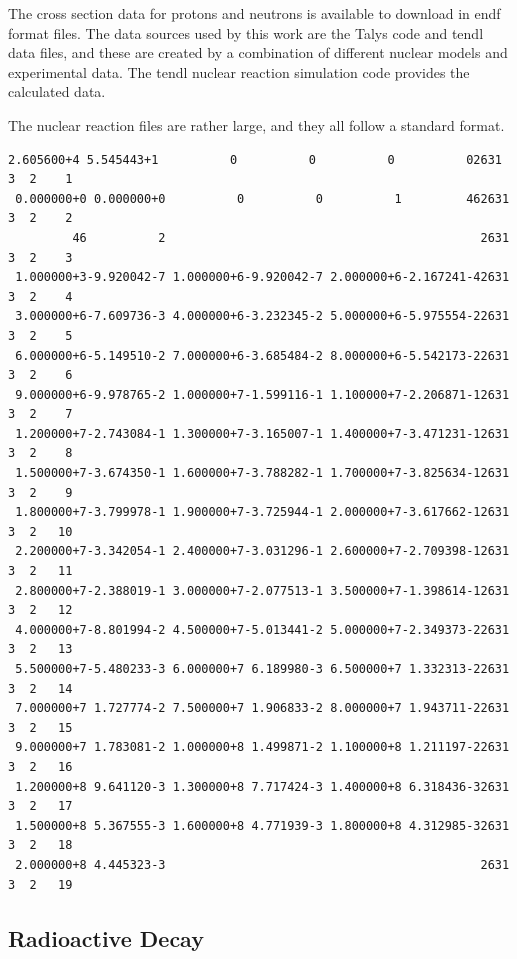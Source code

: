 The cross section data for protons and neutrons is available to download in \acrshort{endf} format files.  The data sources used by this work are the Talys code and \acrshort{tendl} data files, and these are created by a combination of different nuclear models and experimental data.  The \acrshort{tendl} nuclear reaction simulation code provides the calculated data.

The nuclear reaction files are rather large, and they all follow a standard format.


\begin{lstlisting}[style=sPseudo,caption={Sample TENDL File}]
 2.605600+4 5.545443+1          0          0          0          02631 3  2    1
 0.000000+0 0.000000+0          0          0          1         462631 3  2    2
         46          2                                            2631 3  2    3
 1.000000+3-9.920042-7 1.000000+6-9.920042-7 2.000000+6-2.167241-42631 3  2    4
 3.000000+6-7.609736-3 4.000000+6-3.232345-2 5.000000+6-5.975554-22631 3  2    5
 6.000000+6-5.149510-2 7.000000+6-3.685484-2 8.000000+6-5.542173-22631 3  2    6
 9.000000+6-9.978765-2 1.000000+7-1.599116-1 1.100000+7-2.206871-12631 3  2    7
 1.200000+7-2.743084-1 1.300000+7-3.165007-1 1.400000+7-3.471231-12631 3  2    8
 1.500000+7-3.674350-1 1.600000+7-3.788282-1 1.700000+7-3.825634-12631 3  2    9
 1.800000+7-3.799978-1 1.900000+7-3.725944-1 2.000000+7-3.617662-12631 3  2   10
 2.200000+7-3.342054-1 2.400000+7-3.031296-1 2.600000+7-2.709398-12631 3  2   11
 2.800000+7-2.388019-1 3.000000+7-2.077513-1 3.500000+7-1.398614-12631 3  2   12
 4.000000+7-8.801994-2 4.500000+7-5.013441-2 5.000000+7-2.349373-22631 3  2   13
 5.500000+7-5.480233-3 6.000000+7 6.189980-3 6.500000+7 1.332313-22631 3  2   14
 7.000000+7 1.727774-2 7.500000+7 1.906833-2 8.000000+7 1.943711-22631 3  2   15
 9.000000+7 1.783081-2 1.000000+8 1.499871-2 1.100000+8 1.211197-22631 3  2   16
 1.200000+8 9.641120-3 1.300000+8 7.717424-3 1.400000+8 6.318436-32631 3  2   17
 1.500000+8 5.367555-3 1.600000+8 4.771939-3 1.800000+8 4.312985-32631 3  2   18
 2.000000+8 4.445323-3                                            2631 3  2   19
\end{lstlisting}








\subsection{Radioactive Decay}

